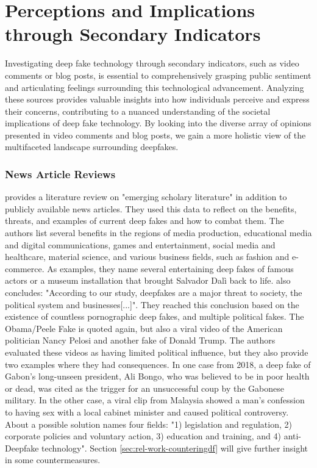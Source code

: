\documentclass[
  a4paper,  %
  twoside,  %
  bibliography=totoc,
  headsepline,
  cleardoublepage=empty,
  parskip=half,
  draft=false
]{scrbook}
\begin{document}
\section{Perceptions and Implications through Secondary Indicators} 
\label{sec:rel-secondary}

Investigating deep fake technology through secondary indicators, such as video comments or blog posts, is essential to comprehensively grasping public sentiment and articulating feelings surrounding this technological advancement. Analyzing these sources provides valuable insights into how individuals perceive and express their concerns, contributing to a nuanced understanding of the societal implications of deep fake technology. By looking into the diverse array of opinions presented in video comments and blog posts, we gain a more holistic view of the multifaceted landscape surrounding deepfakes.

\subsubsection*{News Article Reviews}
\citet{westerlundEmergenceDeepfakeTechnology2019a} provides a literature review on "emerging scholary literature" in addition to publicly available news articles. They used this data to reflect on the benefits, threats, and examples of current deep fakes and how to combat them. The authors list several benefits in the regions of media production, educational media and digital communications, games and entertainment, social media and healthcare, material science, and various business fields, such as fashion and e-commerce. As examples, they name several entertaining deep fakes of famous actors or a museum installation that brought Salvador Dalì back to life.  also concludes: "According to our study, deepfakes are a major threat to society, the political system and businesses[...]". They reached this conclusion based on the existence of countless pornographic deep fakes, and multiple political fakes. The Obama/Peele Fake is quoted again, but also a viral video of the American politician Nancy Pelosi and another fake of Donald Trump. The authors evaluated these videos as having limited political influence, but they also provide two examples where they had consequences. In one case from 2018, a deep fake of Gabon's long-unseen president, Ali Bongo, who was believed to be in poor health or dead, was cited as the trigger for an unsuccessful coup by the Gabonese military. In the other case, a viral clip from Malaysia showed a man's confession to having sex with a local cabinet minister and caused political controversy. \\
About a possible solution  names four fields: "1) legislation and regulation, 2) corporate policies and voluntary action, 3) education and training, and 4) anti-Deepfake technology". Section \ref{sec:rel-work-counteringdf} will give further insight in some countermeasures.
\end{document}
